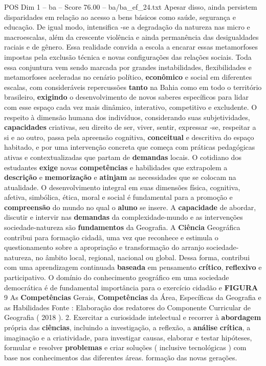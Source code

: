 \begin{textsample}{POS Dim 1 – ba – Score 76.00 – ba/ba\_ef\_24.txt}
Apesar disso, ainda persistem disparidades em relação ao acesso a bens básicos como saúde, segurança e educação.
De igual modo, intensifica -se a degradação da natureza nas micro e macroescalas, além da crescente violência e ainda permanência das desigualdades raciais e de gênero.
Essa realidade convida a escola a encarar essas metamorfoses impostas pela exclusão técnica e novas configurações das relações sociais.
Toda essa conjuntura vem sendo marcada por grandes instabilidades, flexibilidades e metamorfoses aceleradas no cenário político, \textbf{econômico} e social em diferentes escalas, com consideráveis repercussões \textbf{tanto} na Bahia como em todo o território brasileiro, \textbf{exigindo} o desenvolvimento de novos saberes específicos para lidar com esse espaço cada vez mais dinâmico, interativo, competitivo e excludente.
O respeito à dimensão humana dos indivíduos, considerando suas subjetividades, \textbf{capacidades} criativas, seu direito de ser, viver, sentir, expressar -se, respeitar a si e ao outro, passa pela apreensão cognitiva, \textbf{conceitual} e descritiva do espaço habitado, e por uma intervenção concreta que começa com práticas pedagógicas ativas e contextualizadas que partam de \textbf{demandas} locais.
O cotidiano dos estudantes \textbf{exige} novas \textbf{competências} e habilidades que extrapolem a \textbf{descrição} e \textbf{memorização} e \textbf{atinjam} as necessidades que se colocam na atualidade.
O desenvolvimento integral em suas dimensões física, cognitiva, afetiva, simbólica, ética, moral e social é fundamental para a promoção e \textbf{compreensão} do mundo no qual o \textbf{aluno} se insere.
A \textbf{capacidade} de abordar, discutir e intervir nas \textbf{demandas} da complexidade-mundo e as intervenções sociedade-natureza são \textbf{fundamentos} da Geografia.
A \textbf{Ciência} Geográfica contribui para formação cidadã, uma vez que reconhece e estimula o questionamento sobre a apropriação e transformação do arranjo sociedade-natureza, no âmbito local, regional, nacional ou global.
Dessa forma, contribui com uma aprendizagem continuada \textbf{baseada} em pensamento \textbf{crítico}, \textbf{reflexivo} e participativo.
O domínio do conhecimento geográfico em uma sociedade democrática é de fundamental importância para o exercício cidadão e \textbf{FIGURA} 9 As \textbf{Competências} Gerais, \textbf{Competências} da Área, Específicas da Geografia e as Habilidades Fonte : Elaboração dos redatores do Componente Curricular de Geografia ( 2018 ). 2.
Exercitar a curiosidade intelectual e recorrer à \textbf{abordagem} própria das \textbf{ciências}, incluindo a investigação, a reflexão, a \textbf{análise} \textbf{crítica}, a imaginação e a criatividade, para investigar causas, elaborar e testar hipóteses, formular e resolver \textbf{problemas} e criar soluções ( inclusive tecnológicas ) com base nos conhecimentos das diferentes áreas. formação das novas gerações.

\end{textsample}
